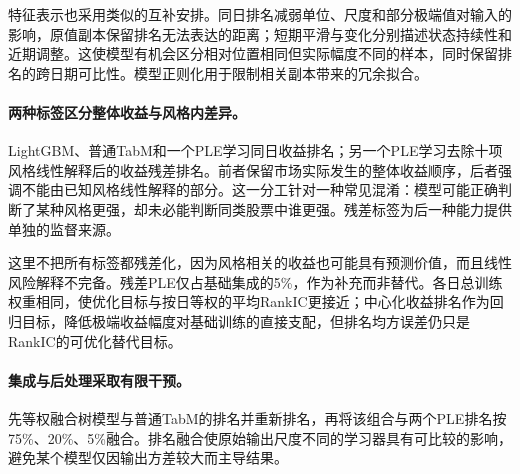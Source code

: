 \documentclass[UTF8,11pt,a4paper,fontset=fandol]{ctexart}
\begin{document}
特征表示也采用类似的互补安排。同日排名减弱单位、尺度和部分极端值对输入的影响，原值副本保留排名无法表达的距离；短期平滑与变化分别描述状态持续性和近期调整。这使模型有机会区分相对位置相同但实际幅度不同的样本，同时保留排名的跨日期可比性。模型正则化用于限制相关副本带来的冗余拟合。

\paragraph{两种标签区分整体收益与风格内差异。}
LightGBM、普通TabM和一个PLE学习同日收益排名；另一个PLE学习去除十项风格线性解释后的收益残差排名。前者保留市场实际发生的整体收益顺序，后者强调不能由已知风格线性解释的部分。这一分工针对一种常见混淆：模型可能正确判断了某种风格更强，却未必能判断同类股票中谁更强。残差标签为后一种能力提供单独的监督来源。

这里不把所有标签都残差化，因为风格相关的收益也可能具有预测价值，而且线性风险解释不完备。残差PLE仅占基础集成的5\%，作为补充而非替代。各日总训练权重相同，使优化目标与按日等权的平均RankIC更接近；中心化收益排名作为回归目标，降低极端收益幅度对基础训练的直接支配，但排名均方误差仍只是RankIC的可优化替代目标。

\paragraph{集成与后处理采取有限干预。}
先等权融合树模型与普通TabM的排名并重新排名，再将该组合与两个PLE排名按75\%、20\%、5\%融合。排名融合使原始输出尺度不同的学习器具有可比较的影响，避免某个模型仅因输出方差较大而主导结果。
\end{document}
